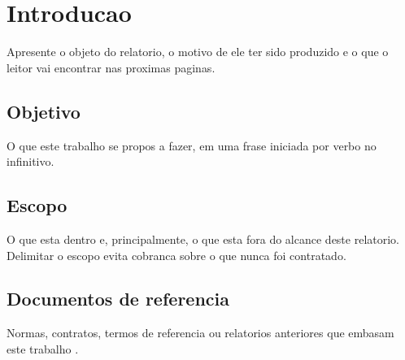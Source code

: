 \chapter{Introducao}
\label{cap:introducao}

Apresente o objeto do relatorio, o motivo de ele ter sido produzido e o que o
leitor vai encontrar nas proximas paginas.

\section{Objetivo}
\label{sec:objetivo}

O que este trabalho se propos a fazer, em uma frase iniciada por verbo no
infinitivo.

\section{Escopo}
\label{sec:escopo}

O que esta dentro e, principalmente, o que esta fora do alcance deste
relatorio. Delimitar o escopo evita cobranca sobre o que nunca foi contratado.

\section{Documentos de referencia}
\label{sec:referencia}

Normas, contratos, termos de referencia ou relatorios anteriores que embasam
este trabalho \cite{nbr10719}.
